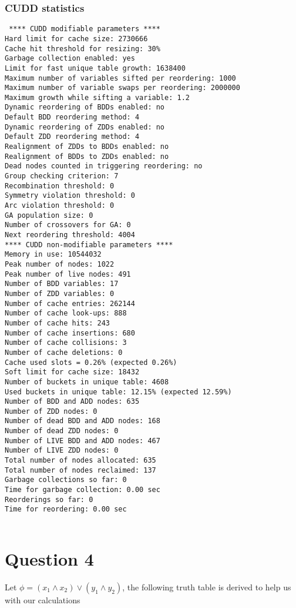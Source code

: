 \documentclass[a4paper]{article}
\begin{document}
\subsubsection*{CUDD statistics}
\begin{verbatim}
 **** CUDD modifiable parameters ****
Hard limit for cache size: 2730666
Cache hit threshold for resizing: 30%
Garbage collection enabled: yes
Limit for fast unique table growth: 1638400
Maximum number of variables sifted per reordering: 1000
Maximum number of variable swaps per reordering: 2000000
Maximum growth while sifting a variable: 1.2
Dynamic reordering of BDDs enabled: no
Default BDD reordering method: 4
Dynamic reordering of ZDDs enabled: no
Default ZDD reordering method: 4
Realignment of ZDDs to BDDs enabled: no
Realignment of BDDs to ZDDs enabled: no
Dead nodes counted in triggering reordering: no
Group checking criterion: 7
Recombination threshold: 0
Symmetry violation threshold: 0
Arc violation threshold: 0
GA population size: 0
Number of crossovers for GA: 0
Next reordering threshold: 4004
**** CUDD non-modifiable parameters ****
Memory in use: 10544032
Peak number of nodes: 1022
Peak number of live nodes: 491
Number of BDD variables: 17
Number of ZDD variables: 0
Number of cache entries: 262144
Number of cache look-ups: 888
Number of cache hits: 243
Number of cache insertions: 680
Number of cache collisions: 3
Number of cache deletions: 0
Cache used slots = 0.26% (expected 0.26%)
Soft limit for cache size: 18432
Number of buckets in unique table: 4608
Used buckets in unique table: 12.15% (expected 12.59%)
Number of BDD and ADD nodes: 635
Number of ZDD nodes: 0
Number of dead BDD and ADD nodes: 168
Number of dead ZDD nodes: 0
Number of LIVE BDD and ADD nodes: 467
Number of LIVE ZDD nodes: 0
Total number of nodes allocated: 635
Total number of nodes reclaimed: 137
Garbage collections so far: 0
Time for garbage collection: 0.00 sec
Reorderings so far: 0
Time for reordering: 0.00 sec


\end{verbatim}

  \newpage
\section*{Question 4}
Let $\phi = (x_1 \wedge x_2) \vee (y_1 \wedge y_2) $, the following truth table is derived to help us with our calculations
\end{document}
